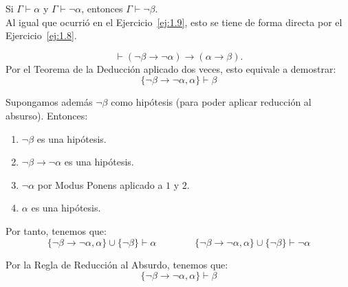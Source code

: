 \begin{ejercicio}\label{ej:1.10}
    Si $\Gamma \vdash \alpha$ y $\Gamma \vdash \neg\alpha$, entonces $\Gamma \vdash \neg\beta$.\\

    Al igual que ocurrió en el Ejercicio~\ref{ej:1.9}, esto se tiene de forma directa por el Ejercicio~\ref{ej:1.8}.
\end{ejercicio}

\begin{ejercicio}\label{ej:1.11}
    $$\vdash (\neg\beta \rightarrow \neg\alpha) \rightarrow (\alpha \rightarrow \beta).$$
    Por el Teorema de la Deducción aplicado dos veces, esto equivale a demostrar:
    \begin{equation*}
        \{\neg\beta\rightarrow\neg\alpha,\alpha\} \vdash \beta
    \end{equation*}

    Supongamos además $\neg \beta$ como hipótesis (para poder aplicar reducción al absurso). Entonces:
    \begin{enumerate}
        \item $\neg\beta$ es una hipótesis.
        \item $\neg\beta\rightarrow \neg\alpha$ es una hipótesis.
        \item $\neg\alpha$ por Modus Ponens aplicado a $1$ y $2$.
        \item $\alpha$ es una hipótesis.
    \end{enumerate}

    Por tanto, tenemos que:
    \begin{equation*}
        \{\neg\beta\rightarrow\neg\alpha,\alpha\}\cup \{\neg\beta\} \vdash \alpha\qquad\qquad\{\neg\beta\rightarrow\neg\alpha,\alpha\}\cup \{\neg\beta\} \vdash \neg\alpha
    \end{equation*}

    Por la Regla de Reducción al Absurdo, tenemos que:
    \begin{equation*}
        \{\neg\beta\rightarrow\neg\alpha,\alpha\} \vdash \beta
    \end{equation*}
\end{ejercicio}

